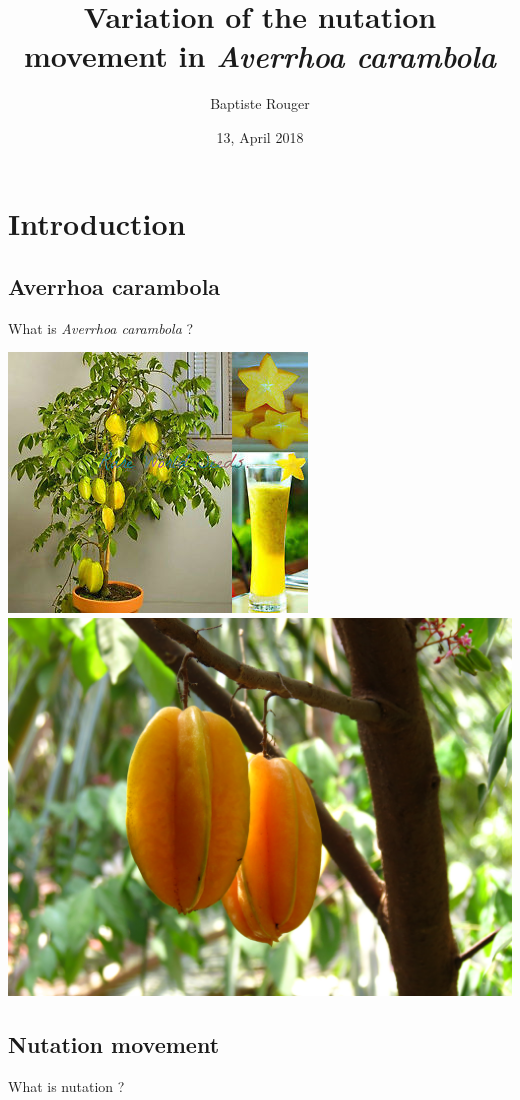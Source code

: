 \documentclass[12pt]{beamer}
\author{Baptiste Rouger}
\title{Variation of the nutation movement in \textit{Averrhoa carambola}}
\date{13, April 2018}
\begin{document}
\begin{frame}
\titlepage
\end{frame}

\section{Introduction}
\subsection{Averrhoa carambola}
\begin{frame}{What is \textit{Averrhoa carambola} ?}

\includegraphics[width= 0.45\linewidth]{carambTree.jpeg} \hfill \includegraphics[width= 0.45\linewidth]{carambFruit.jpg}

\end{frame}

\subsection{Nutation movement}
\begin{frame}{What is nutation ?}
\begin{center}
\end{center}


\end{frame}
\end{document}
